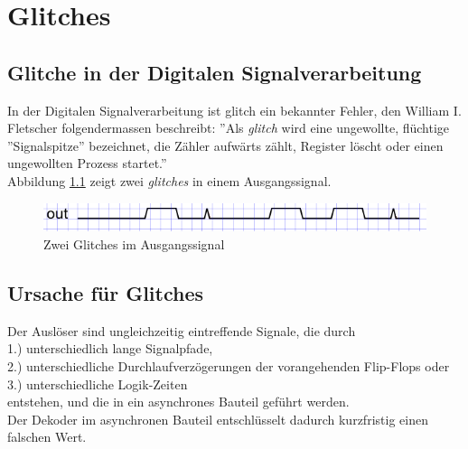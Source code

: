 
\chapter{Glitches}\label{chap.glitch}

\section{Glitche in der Digitalen Signalverarbeitung}\label{sect.glitch_def}
In der Digitalen Signalverarbeitung ist glitch ein bekannter Fehler, den William I. Fletscher folgendermassen beschreibt: ''Als \textit{glitch}  wird eine ungewollte, flüchtige ''Signalspitze'' bezeichnet, die Zähler aufwärts zählt, Register löscht oder einen ungewollten Prozess startet.'' \cite{F_glitches} \\


Abbildung \ref{fig.glitch.def} zeigt zwei \textit{glitches} in einem Ausgangssignal.\\

\begin{figure}[H]
	\centering
	\includegraphics[width=\textwidth]{images/glitch/def_glitch_1.png}
	\caption{Zwei Glitches im Ausgangssignal}
	\label{fig.glitch.def}
\end{figure}


\section{Ursache für Glitches}\label{sect.glitch_ursache}
Der Auslöser sind ungleichzeitig eintreffende Signale, die durch \\
1.) unterschiedlich lange Signalpfade, \\
2.) unterschiedliche Durchlaufverzögerungen der vorangehenden Flip-Flops oder \\
3.) unterschiedliche Logik-Zeiten \\
entstehen, und die in ein asynchrones Bauteil geführt werden.\\
Der Dekoder im asynchronen Bauteil entschlüsselt dadurch kurzfristig einen falschen Wert. \\

